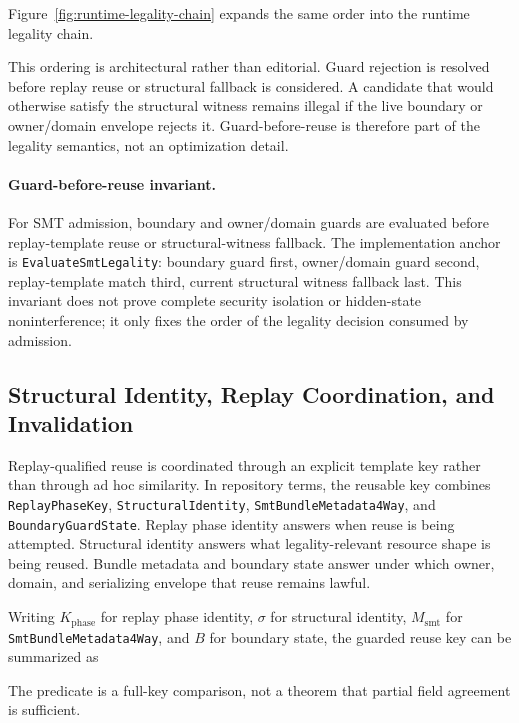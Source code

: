 \documentclass[twocolumn]{article}
\begin{document}


Figure~\ref{fig:runtime-legality-chain} expands the same order into the runtime legality chain.



This ordering is architectural rather than editorial. Guard rejection is resolved before replay reuse or structural fallback is considered. A candidate that would otherwise satisfy the structural witness remains illegal if the live boundary or owner/domain envelope rejects it. Guard-before-reuse is therefore part of the legality semantics, not an optimization detail.

\paragraph{Guard-before-reuse invariant.}
For SMT admission, boundary and owner/domain guards are evaluated before replay-template reuse or structural-witness fallback. The implementation anchor is \texttt{EvaluateSmtLegality}: boundary guard first, owner/domain guard second, replay-template match third, current structural witness fallback last. This invariant does not prove complete security isolation or hidden-state noninterference; it only fixes the order of the legality decision consumed by admission.


\subsection{Structural Identity, Replay Coordination, and Invalidation}

Replay-qualified reuse is coordinated through an explicit template key rather than through ad hoc similarity. In repository terms, the reusable key combines \texttt{ReplayPhaseKey}, \texttt{StructuralIdentity}, \texttt{SmtBundleMetadata4Way}, and \texttt{BoundaryGuardState}. Replay phase identity answers when reuse is being attempted. Structural identity answers what legality-relevant resource shape is being reused. Bundle metadata and boundary state answer under which owner, domain, and serializing envelope that reuse remains lawful.

Writing \(K_{\mathrm{phase}}\) for replay phase identity, \(\sigma\) for structural identity, \(M_{\mathrm{smt}}\) for \texttt{SmtBundleMetadata4Way}, and \(B\) for boundary state, the guarded reuse key can be summarized as

The predicate is a full-key comparison, not a theorem that partial field agreement is sufficient.
\end{document}
